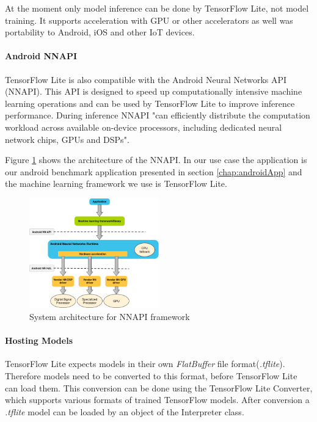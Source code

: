 At the moment only model inference can be done by TensorFlow Lite, not model training.
It supports acceleration with GPU or other accelerators as well was portability to Android, iOS and other IoT devices.

\paragraph{Android NNAPI}
\label{chap:NNAPI}
TensorFlow Lite is also compatible with the Android Neural Networks API (NNAPI). This API
is designed to speed up computationally intensive machine learning operations and can be used by TensorFlow Lite to improve inference performance. During inference NNAPI "can
efficiently distribute the computation workload across available on-device processors, including dedicated neural network chips, GPUs and DSPs"\cite{DBLP:journals/corr/abs-1810-01109}.

Figure \ref{fig:NNAPIarchitecture} shows the architecture of the NNAPI. In our use case the application is our android benchmark application presented in section \ref{chap:androidApp} and the machine learning framework we use is TensorFlow Lite.
\begin{figure}[!htb]
\centering
\includegraphics[width=0.5\textwidth]{./Bilder/nnapi_architecture.png}
\caption{System architecture for NNAPI framework \cite{NNAPI}}
\label{fig:NNAPIarchitecture}
\end{figure}


\paragraph{Hosting Models}
TensorFlow Lite expects models in their own \emph{FlatBuffer} file  format(\emph{.tflite}). Therefore models need to be converted to this format, before TensorFlow Lite can load them. This conversion can be done using the TensorFlow Lite Converter, which supports various formats of trained TensorFlow models.
After conversion a \emph{.tflite} model can be loaded by an object of the Interpreter class.
